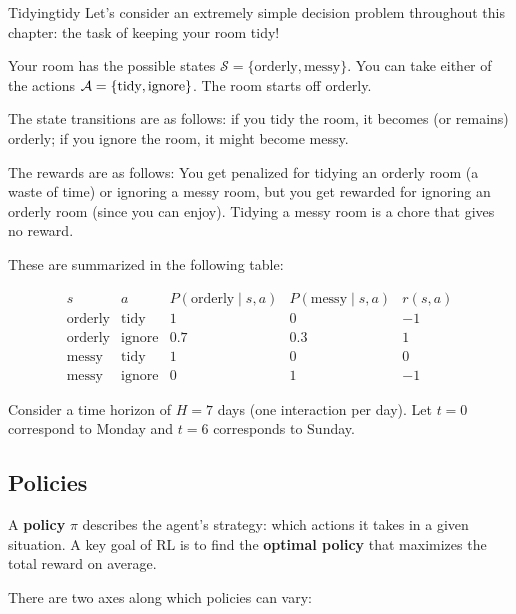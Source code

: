 \documentclass[../main/main]{subfiles}
\begin{document}
\begin{example}{Tidying}{tidy}
    Let's consider an extremely simple decision problem throughout this chapter: the task of keeping your room tidy!

    Your room has the possible states $\mathcal{S} = \{ \text{orderly}, \text{messy} \}$. You can take either of the actions $\mathcal{A} = \{ \text{tidy}, \text{ignore} \}$. The room starts off orderly.
    
    The state transitions are as follows: if you tidy the room, it becomes (or remains) orderly; if you ignore the room, it might become messy.
    
    The rewards are as follows: You get penalized for tidying an orderly room (a waste of time) or ignoring a messy room, but you get rewarded for ignoring an orderly room (since you can enjoy). Tidying a messy room is a chore that gives no reward.
    
    These are summarized in the following table:

    \[
    \begin{array}{ccccc}
        s & a & P(\text{orderly} \mid s, a) & P(\text{messy} \mid s, a) & r(s, a) \\
        \text{orderly} & \text{tidy} & 1 & 0 & -1 \\
        \text{orderly} & \text{ignore} & 0.7 & 0.3 & 1 \\
        \text{messy} & \text{tidy} & 1 & 0 & 0 \\
        \text{messy} & \text{ignore} & 0 & 1 & -1
    \end{array}
    \]

    Consider a time horizon of $H = 7$ days (one interaction per day). Let $t = 0$ correspond to Monday and $t = 6$ corresponds to Sunday.
\end{example}

\subsection{Policies}

A \textbf{policy} $\pi$ describes the agent's strategy: which actions it takes in a given situation. A key goal of RL is to find the \textbf{optimal policy} that maximizes the total reward on average.

There are two axes along which policies can vary:
\end{document}
